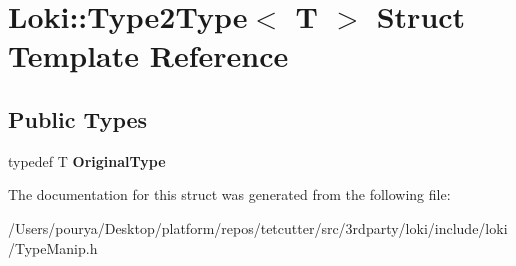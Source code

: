 \hypertarget{structLoki_1_1Type2Type}{}\section{Loki\+:\+:Type2\+Type$<$ T $>$ Struct Template Reference}
\label{structLoki_1_1Type2Type}
\subsection*{Public Types}
\begin{DoxyCompactItemize}
\item 
\hypertarget{structLoki_1_1Type2Type_a9da7076cf69d25312bf289e744cb1a21}{}typedef T {\bfseries Original\+Type}\label{structLoki_1_1Type2Type_a9da7076cf69d25312bf289e744cb1a21}

\end{DoxyCompactItemize}


The documentation for this struct was generated from the following file\+:\begin{DoxyCompactItemize}
\item 
/\+Users/pourya/\+Desktop/platform/repos/tetcutter/src/3rdparty/loki/include/loki/Type\+Manip.\+h\end{DoxyCompactItemize}
